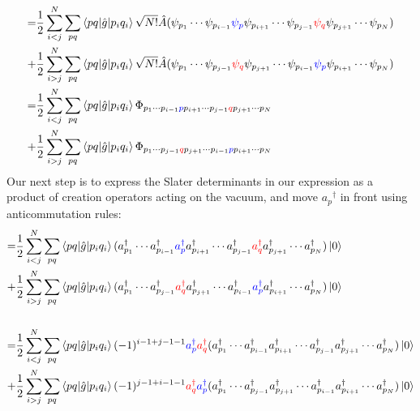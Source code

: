\documentclass{article}
\newcommand{\dg}{\ensuremath{^\dagger} }
\newcommand{\cd}{\ensuremath{\cdots} }
\begin{document}
\begin{align*}
= &\frac{1}{2} \sum\limits_{i < j} ^N   \sum_{pq}  \braket{pq | \hat{g} | p_i q_i }  \sqrt{N!}   \hat{A}  (\psi_{p_1} \cd \psi_{p_{i - 1}} {\color{blue} \psi_{p}} \psi_{p_{i +1}} \cd  \psi_{p_{j - 1}} {\color{red} \psi_{q}}\psi_{p_{j +1}} \cd \psi_{p_N})  \\
+ &\frac{1}{2} \sum\limits_{i > j} ^N   \sum_{pq}  \braket{pq | \hat{g} | p_i q_i } \sqrt{N!}   \hat{A}  (\psi_{p_1} \cd \psi_{p_{j - 1}}  {\color{red} \psi_{q}}\psi_{p_{j +1}} \cd  \psi_{p_{i - 1}} {\color{blue} \psi_{p}}\psi_{p_{i +1}} \cd \psi_{p_N})  \\
= &\frac{1}{2} \sum\limits_{i < j} ^N   \sum_{pq}  \braket{pq | \hat{g} | p_i q_i } \Phi_{{p_1} \cd p_{i - 1} {\color{blue} {p}} {p_{i +1}} \cd  {p_{j - 1}} {\color{red} {q}}{p_{j +1}} \cd {p_N}} \\
+ &\frac{1}{2} \sum\limits_{i > j} ^N   \sum_{pq}  \braket{pq | \hat{g} | p_i q_i } \Phi_{{p_1} \cd {p_{j - 1}}  {\color{red} {q}}{p_{j +1}} \cd  {p_{i - 1}} {\color{blue} {p}}{p_{i +1}} \cd {p_N}}  \\
\end{align*}
Our next step is to express the Slater determinants in our expression as a product of creation operators acting on the vacuum, and move $a_p\dg$ in front using anticommutation rules:
\begin{align*}
= &\frac{1}{2} \sum\limits_{i < j} ^N   \sum_{pq}  \braket{pq | \hat{g} | p_i q_i }  (a\dg_{p_1} \cd a\dg_{p_{i - 1}} {\color{blue} a\dg_{p}} a\dg_{p_{i +1}} \cd  a\dg_{p_{j - 1}} {\color{red} a\dg_{q}}a\dg_{p_{j +1}} \cd a\dg_{p_N}) \ket{0}  \\
+ &\frac{1}{2} \sum\limits_{i > j} ^N   \sum_{pq}  \braket{pq | \hat{g} | p_i q_i }  (a\dg_{p_1} \cd a\dg_{p_{j - 1}}  {\color{red} a\dg_{q}}a\dg_{p_{j +1}} \cd  a\dg_{p_{i - 1}} {\color{blue} a\dg_{p}}a\dg_{p_{i +1}} \cd a\dg_{p_N})  \ket{0}  \\ \\
= &\frac{1}{2} \sum\limits_{i < j} ^N   \sum_{pq}  \braket{pq | \hat{g} | p_i q_i } (-1)^{i - 1 + j - 1 - 1}  {\color{blue}  a\dg_{p}}  {\color{red} a\dg_{q}} (a\dg_{p_1} \cd a\dg_{p_{i - 1}}  a\dg_{p_{i +1}} \cd  a\dg_{p_{j - 1}} a\dg_{p_{j +1}} \cd a\dg_{p_N}) \ket{0}  \\
+ &\frac{1}{2} \sum\limits_{i > j} ^N   \sum_{pq}  \braket{pq | \hat{g} | p_i q_i } (-1)^{j - 1 + i -1 -1}  {\color{red} a\dg_{q}}   {\color{blue} a\dg_{p}} (a\dg_{p_1} \cd a\dg_{p_{j - 1}} a\dg_{p_{j +1}} \cd  a\dg_{p_{i - 1}}a\dg_{p_{i +1}} \cd a\dg_{p_N})  \ket{0}  \\
\end{align*}
\end{document}

